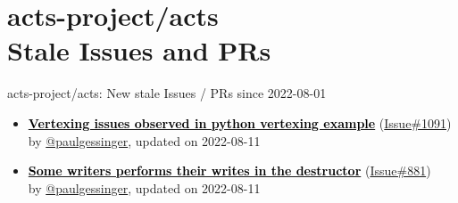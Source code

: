 \documentclass{beamer}
\begin{document}
\section{ acts-project/acts \\ Stale Issues and PRs}
\begin{frame}[allowframebreaks]{ acts-project/acts: New stale Issues / PRs since 2022-08-01 }
  \begin{itemize}
    
    \item
    \textbf{\href{https://github.com/acts-project/acts/issues/1091}{\textcolor{black}{Vertexing issues observed in python vertexing example}}}
    (\href{https://github.com/acts-project/acts/issues/1091}{Issue\#1091}) \\
    by \href{https://github.com/paulgessinger}{ @paulgessinger}, updated on 2022-08-11

    \item
    \textbf{\href{https://github.com/acts-project/acts/issues/881}{\textcolor{black}{Some writers performs their writes in the destructor}}}
    (\href{https://github.com/acts-project/acts/issues/881}{Issue\#881}) \\
    by \href{https://github.com/paulgessinger}{ @paulgessinger}, updated on 2022-08-11

  \end{itemize}
\end{frame}
\end{document}
